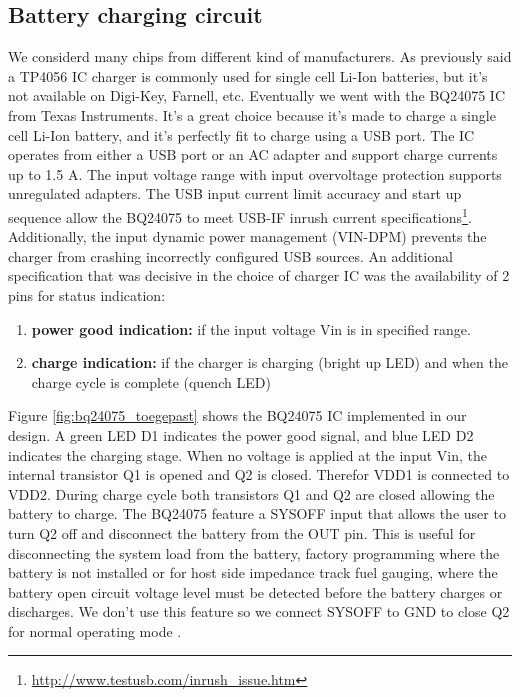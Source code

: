\documentclass[11pt,a4paper]{article}
\begin{document}
\subsection{Battery charging circuit}
We considerd many chips from different kind of manufacturers. As previously said a TP4056 IC charger is commonly used for single cell Li-Ion batteries, but it's not available on Digi-Key, Farnell, etc. Eventually we went with the BQ24075 IC from Texas Instruments. It's a great choice because it's made to charge a single cell Li-Ion battery, and it's perfectly fit to charge using a USB port. The IC operates from either a USB port or an AC adapter and support charge currents up to 1.5 A. The input voltage range with input overvoltage protection supports unregulated adapters. The USB input current limit accuracy and start up sequence allow the BQ24075 to meet USB-IF inrush current specifications\footnote{\url{http://www.testusb.com/inrush_issue.htm}}. Additionally, the input dynamic power management (VIN-DPM) prevents the charger from crashing incorrectly configured USB sources. An additional specification that was decisive in the choice of charger IC was the availability of 2 pins for status indication:
\begin{enumerate}
	\item \textbf{power good indication:} if the input voltage Vin is in specified range.
	\item \textbf{charge indication:} if the charger is charging (bright up LED) and when the charge cycle is complete (quench LED)
\end{enumerate}
Figure \ref{fig:bq24075_toegepast} shows the BQ24075 IC implemented in our design. A green LED D1 indicates the power good signal, and blue LED D2 indicates the charging stage. When no voltage is applied at the input Vin, the internal transistor Q1 is opened and Q2 is closed. Therefor VDD1 is connected to VDD2. During charge cycle both transistors Q1 and Q2 are closed allowing the battery to charge. The BQ24075 feature a SYSOFF input that allows the user to turn Q2 off and disconnect the battery from the OUT pin. This is useful for disconnecting the system load from the battery, factory programming where the battery is not installed or for host side impedance track fuel gauging, where the battery open circuit voltage level must be detected before the battery charges or discharges. We don't use this feature so we connect SYSOFF to GND to close Q2 for normal operating mode \cite{bib:BQ24075}. %
\end{document}
